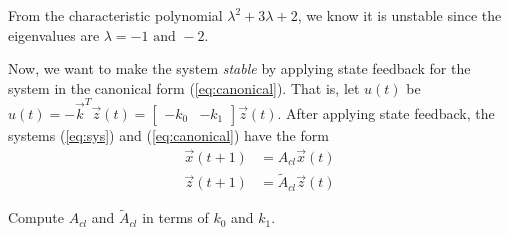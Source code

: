 \begin{enumerate}
\begin{enumerate}[resume]
{From the characteristic polynomial $\lambda^2 +3 \lambda + 2$,
we know it is unstable since the eigenvalues are $\lambda = -1 \mbox{ and }-2$.
}
\end{enumerate}

Now, we want to make the system \textit{stable} by applying state feedback for the system in the canonical form (\ref{eq:canonical}).
That is, let $u(t)$ be $u(t) = -\vec{k}^T\vec{z}(t) = \begin{bmatrix}
-k_0 & -k_1
\end{bmatrix}
\vec{z}(t)$.
After applying state feedback, the systems (\ref{eq:sys}) and (\ref{eq:canonical}) have the form
\begin{align*}
\vec{x}(t+1) &= A_{cl} \vec{x}(t) \\
\vec{z}(t+1) &= \widetilde{A}_{cl} \vec{z}(t)
\end{align*}

\begin{enumerate}[resume]

\qitem Compute $A_{cl}$ and $\widetilde{A}_{cl}$ in terms of $k_0$ and $k_1$.

\end{enumerate}
\end{enumerate}

